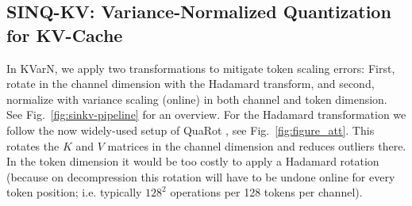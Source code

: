 \documentclass{llmxive}
\providecommand{\methodname}{SINQ-KV\xspace}
\begin{document}
\subsection{\methodname: Variance-Normalized Quantization for KV-Cache}
\label{sec:sinq-kv}
In KVarN, we apply two transformations to mitigate token scaling errors: First, rotate in the channel dimension with the Hadamard transform, and second, normalize with variance scaling (online) in both channel and token dimension. See Fig.~\ref{fig:sinkv-pipeline} for an overview. For the Hadamard transformation we follow the now widely-used setup of QuaRot \cite{ashkboos2024quarot}, see Fig.~\ref{fig:figure_att}. This rotates the $K$ and $V$ matrices in the channel dimension and reduces outliers there. 
In the token dimension it would be too costly to apply a Hadamard rotation (because on decompression this rotation will have to be undone online for every token position; i.e. typically $128^2$ operations per 128 tokens per channel).  



\end{document}
